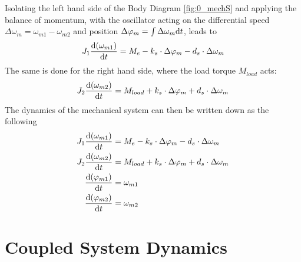 Isolating the left hand side of the Body Diagram \ref{fig:0_mechS} and applying the balance of momentum, with the oscillator acting on the differential speed $\Delta\omega_m = \omega_{m1} - \omega_{m2}$ and position $ \Delta \varphi_m = \int \Delta\omega_m \mathrm{d} t$, leads to
\[
J_1 \frac{\mathrm{d}(\omega_{m1})}{\mathrm{d} t} = M_e - k_s \cdot \Delta\varphi_m - d_s \cdot \Delta\omega_m
\]
 The same is done for the right hand side, where the load torque $M_{load}$ acts:
 \[
 J_2 \frac{\mathrm{d}(\omega_{m2})}{\mathrm{d} t} = M_{load} + k_s\cdot \Delta\varphi_m + d_s \cdot  \Delta\omega_m
 \]
The dynamics of the mechanical system can then be written down as the following
\begin{equation}
	\begin{split}
			J_1 \frac{\mathrm{d}(\omega_{m1})}{\mathrm{d} t} &= M_e - k_s \cdot \Delta\varphi_m - d_s \cdot \Delta\omega_m \\
			J_2 \frac{\mathrm{d}(\omega_{m2})}{\mathrm{d} t} &= M_{load} + k_s\cdot \Delta\varphi_m + d_s \cdot  \Delta\omega_m \\
			\frac{\mathrm{d}(\varphi_{m1})}{\mathrm{d} t} &= \omega_{m1} \\
			\frac{\mathrm{d}(\varphi_{m2})}{\mathrm{d} t} &= \omega_{m2}
	\end{split}
	\label{equ:1_coupling}
\end{equation}

\section{Coupled System Dynamics} \label{sec:1_coupled_dyn}


